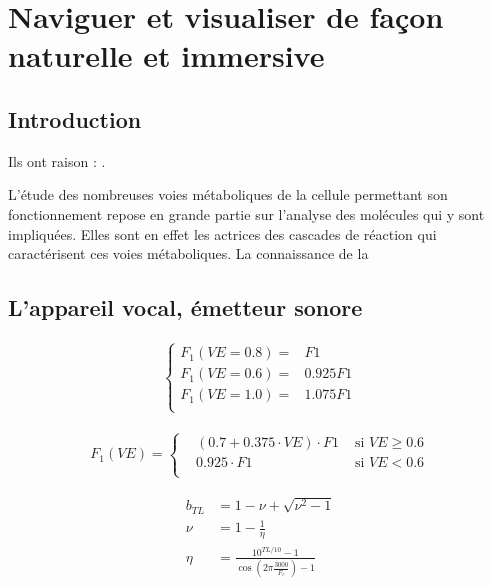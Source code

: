 \chapter[Exploration interactive de données moléculaire en immersion]{Naviguer et visualiser de façon naturelle et immersive}
\minitoc
\cleardoublepage

\section{Introduction}
Ils ont raison : \cite{Klatt80} \cite{Holmes83} \cite{VertegaalUngKie96} \cite{Henrich01} \cite{Cadoz94}.

L'étude des nombreuses voies métaboliques de la cellule permettant son fonctionnement repose en grande partie sur l'analyse des molécules qui y sont impliquées. Elles sont en effet les actrices des cascades de réaction qui caractérisent ces voies métaboliques. La connaissance de la  

\section{L'appareil vocal, émetteur sonore}
\begin{eqnarray}
\left\{ \begin{array}{ll}
	F_1(V\!E=0.8)=&F1 \\
	F_1(V\!E=0.6)=&0.925F1\\
	F_1(V\!E=1.0)=&1.075F1\\
\end{array} \right.
\end{eqnarray}

\begin{eqnarray}
F_1(V\!E)=
\left\{
	\begin{array}{lll}
		&(0.7+0.375 \cdot V\!E) \cdot F1& \mbox{ si $V\!E\geq0.6$}\\
		&0.925 \cdot F1& \mbox{ si $V\!E<0.6$}\\
	\end{array}
\right.
\end{eqnarray}

\begin{equation} 
\begin{split}
b_{TL} & = 1 - \nu + \sqrt{\nu^2-1}\\
\nu    & = 1-\frac{1}{\eta} \\
\eta   & = \frac{10^{TL/10}-1}{\cos(2\pi\frac{3000}{F_e})-1}
\end{split} 
\end{equation} 

